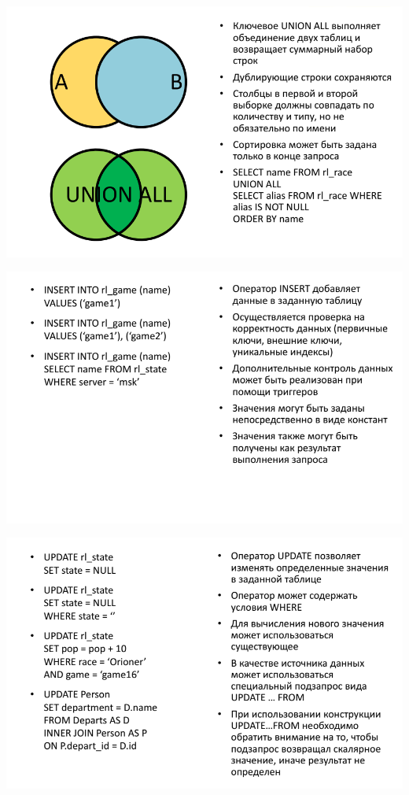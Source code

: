 \documentclass{beamer}
\begin{document}
\begin{frame}
\begin{center}
\includegraphics[scale=0.5]{images/union.png}
\end{center}
\end{frame} 

\begin{frame}
\begin{center}
\includegraphics[scale=0.5]{images/insert-01.png}
\end{center}
\end{frame} 

\begin{frame}
\begin{center}
\includegraphics[scale=0.5]{images/update-01.png}
\end{center}
\end{frame} 
\end{document}
